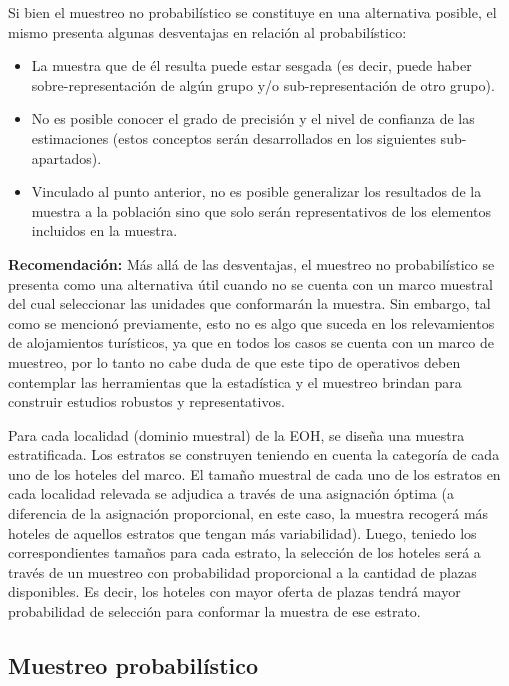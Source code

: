 \documentclass[
]{book}
\begin{document}
Si bien el muestreo no probabilístico se constituye en una alternativa posible, el mismo presenta algunas desventajas en relación al probabilístico:

\begin{itemize}
\item
  La muestra que de él resulta puede estar sesgada (es decir, puede haber sobre-representación de algún grupo y/o sub-representación de otro grupo).
\item
  No es posible conocer el grado de precisión y el nivel de confianza de las estimaciones (estos conceptos serán desarrollados en los siguientes sub-apartados).
\item
  Vinculado al punto anterior, no es posible generalizar los resultados de la muestra a la población sino que solo serán representativos de los elementos incluidos en la muestra.
\end{itemize}

\textbf{Recomendación:} Más allá de las desventajas, el muestreo no probabilístico se presenta como una alternativa útil cuando no se cuenta con un marco muestral del cual seleccionar las unidades que conformarán la muestra. Sin embargo, tal como se mencionó previamente, esto no es algo que suceda en los relevamientos de alojamientos turísticos, ya que en todos los casos se cuenta con un marco de muestreo, por lo tanto no cabe duda de que este tipo de operativos deben contemplar las herramientas que la estadística y el muestreo brindan para construir estudios robustos y representativos.

Para cada localidad (dominio muestral) de la EOH, se diseña una muestra estratificada. Los estratos se construyen teniendo en cuenta la categoría de cada uno de los hoteles del marco. El tamaño muestral de cada uno de los estratos en cada localidad relevada se adjudica a través de una asignación óptima (a diferencia de la asignación proporcional, en este caso, la muestra recogerá más hoteles de aquellos estratos que tengan más variabilidad). Luego, teniedo los correspondientes tamaños para cada estrato, la selección de los hoteles será a través de un muestreo con probabilidad proporcional a la cantidad de plazas disponibles. Es decir, los hoteles con mayor oferta de plazas tendrá mayor probabilidad de selección para conformar la muestra de ese estrato.

\hypertarget{muestreo-probabiluxedstico}{%
\subsection{Muestreo probabilístico}\label{muestreo-probabiluxedstico}}
\end{document}
